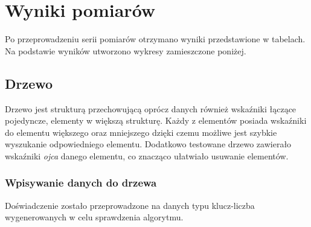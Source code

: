 \documentclass[12pt,a4paper,titlepage]{article}
\begin{document}
\section{Wyniki pomiarów}
Po przeprowadzeniu serii pomiarów otrzymano wyniki przedstawione w tabelach. Na podstawie wyników utworzono wykresy zamieszczone poniżej.


\subsection{Drzewo}
Drzewo jest strukturą przechowującą oprócz danych również wskaźniki łączące pojedyncze, elementy w większą strukturę. Każdy z elementów posiada wskaźniki do elementu większego oraz mniejszego dzięki czemu możliwe jest szybkie wyszukanie odpowiedniego elementu. Dodatkowo testowane drzewo zawierało wskaźniki \textit {ojca} danego elementu, co znacząco ułatwiało usuwanie elementów.


\subsubsection{Wpisywanie danych do drzewa}
Doświadczenie zostało przeprowadzone na danych typu klucz-liczba wygenerowanych w celu sprawdzenia algorytmu. 
\end{document}
